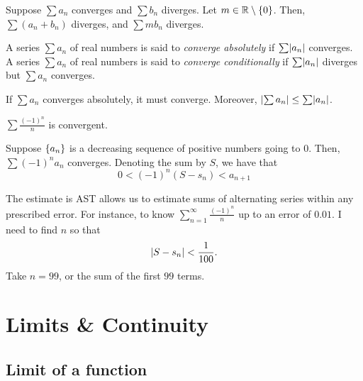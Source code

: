 \documentclass[12pt]{article}
\begin{document}
\begin{cor} \label{cor:}
    Suppose $\sum a_{n}$ converges and $\sum b_{n}$ diverges. Let $m \in \R \setminus \set{0}$. Then, $\sum(a_{n} + b_{n})$ diverges, and $\sum mb_{n}$ diverges.
\end{cor}

\begin{defn} \label{defn:absolute convergence}
    A series $\sum a_{n}$ of real numbers is said to \emph{converge absolutely} if $\sum \abs{ a_{n}}$ converges. A series $\sum a_{n}$ of real numbers is said to \emph{converge conditionally} if $\sum \abs{ a_{n}}$ diverges but $\sum a_{n}$ converges.
\end{defn}

\begin{thm} \label{thm:}
    If $\sum a_{n}$ converges absolutely, it must converge. Moreover, $\abs{ \sum a_{n}} \leq \sum \abs{ a_{n}}$.
\end{thm}

\begin{example}
    $\sum \frac{(-1)^{n}}{n}$ is convergent.
\end{example}

\begin{thm} \label{thm:leibniz test}
    Suppose $\set{a_{n}}$ is a decreasing sequence of positive numbers going to 0. Then, $\sum (-1)^{n} a_{n}$ converges. Denoting the sum by $S$, we have that \[
        0 < (-1)^{n}(S - s_{n}) < a_{n+1}
    \]
\end{thm}

\begin{rem}
    The estimate is AST allows us to estimate sums of alternating series within any prescribed error. For instance, to know $\sum_{n=1}^{\infty} \frac{(-1)^{n}}{n}$ up to an error of $0.01$. I need to find $n$ so that \[
        \abs{ S - s_{n} } < \frac{1}{100}.
    \]
    Take $n = 99$, or the sum of the first $99$ terms.
\end{rem}

\section{Limits \& Continuity}

\subsection{Limit of a function}
\end{document}
